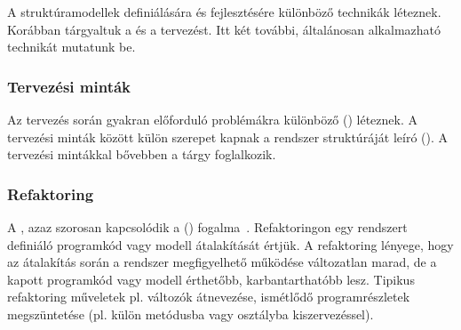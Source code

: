 A struktúramodellek definiálására és fejlesztésére különböző technikák léteznek. Korábban tárgyaltuk a  és a  tervezést. Itt két további, általánosan alkalmazható technikát mutatunk be.

\subsubsection{Tervezési minták}

Az  tervezés során gyakran előforduló problémákra különböző  () léteznek. A tervezési minták között külön szerepet kapnak a rendszer struktúráját leíró  (). A tervezési mintákkal bővebben a \sznikak tárgy foglalkozik.

\subsubsection{Refaktoring}

A , azaz  szorosan kapcsolódik a  () fogalma~\cite{fowler2012refactoring}. Refaktoringon egy rendszert definiáló programkód vagy modell átalakítását értjük. A refaktoring lényege, hogy az átalakítás során a rendszer megfigyelhető működése változatlan marad, de a kapott programkód vagy modell érthetőbb, karbantarthatóbb lesz. Tipikus refaktoring műveletek pl. változók átnevezése, ismétlődő programrészletek megszüntetése (pl. külön metódusba vagy osztályba kiszervezéssel).

%
%
%
%
%


